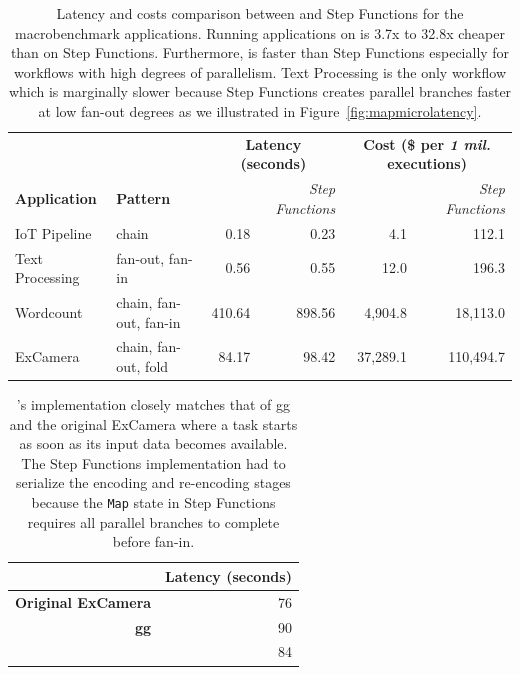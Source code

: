 \begin{table}[t]
	\centering
	\begin{tabular}{ll|rr|rr}
		\hline
		&                        & \multicolumn{2}{c}{\textbf{Latency (seconds)}}            & \multicolumn{2}{c}{\textbf{Cost (\$ per \emph{1 mil.} executions)}}       \\
		\textbf{Application} & \textbf{Pattern}       & \textit{\name{}} & \textit{Step Functions}   & \textit{\name{}} & \textit{Step Functions}            \\ \hline
		IoT Pipeline         & chain                  & 0.18       & 0.23       & 4.1       & 112.1   \\
		Text Processing      & fan-out, fan-in        & 0.56       & 0.55       & 12.0      & 196.3   \\
		Wordcount            & chain, fan-out, fan-in & 410.64     & 898.56     & 4,904.8   & 18,113.0 \\
		ExCamera             & chain, fan-out, fold   & 84.17      & 98.42      & 37,289.1   & 110,494.7      \\ \hline
	\end{tabular}
	\caption{Latency and costs comparison between \name{} and Step Functions for
		the macrobenchmark applications. Running applications on \name{} is 3.7x to
		32.8x cheaper than on Step Functions. Furthermore, \name{} is faster than Step
		Functions especially for workflows with high degrees of parallelism. Text
		Processing is the only workflow which \name{} is marginally slower because
		Step Functions creates parallel branches faster at low fan-out degrees as we
		illustrated in Figure~\ref{fig:mapmicrolatency}.}
	\label{table:macro}
\end{table}

\begin{table}[]
	\centering
	\begin{tabular}{|r|r|}
		\hline
		& \textbf{Latency (seconds)} \\ \hline
		\textbf{Original ExCamera}        & 76                         \\ \hline
		\textbf{gg}                       & 90                         \\ \hline
		\textbf{\name{}} & 84                         \\ \hline
	\end{tabular}
	\caption{\name{}'s implementation closely matches that of gg and the original
		ExCamera where a task starts as soon as its input data becomes available. The
		Step Functions implementation had to serialize the encoding and re-encoding
		stages because the \texttt{Map} state in Step Functions requires all parallel
		branches to complete before fan-in.}
	\label{table:excamera}
\end{table}

